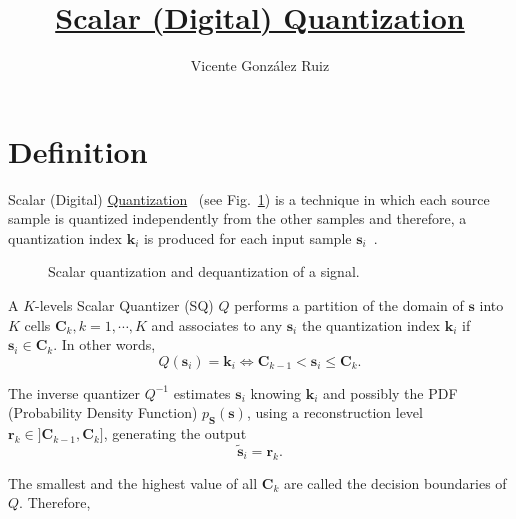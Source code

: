
\title{\href{https://github.com/vicente-gonzalez-ruiz/scalar_quantization}{Scalar (Digital) Quantization}}

\author{Vicente González Ruiz}

\maketitle
\tableofcontents

\section{Definition}

Scalar (Digital)
\href{https://en.wikipedia.org/wiki/Quantization_(signal_processing)}{Quantization}~\cite{sayood2017introduction,vetterli2014foundations}
(see Fig.~\ref{fig:Q}) is a technique in which each source sample is
quantized independently from the other samples and therefore, a
quantization index ${\mathbf k}_i$ is produced for each input sample
${\mathbf s}_i$~\cite{vruiz__signal_quantization}.

\begin{figure}
  \caption{Scalar quantization and dequantization of a signal.}
  \label{fig:Q}
\end{figure}

A $K$-levels Scalar Quantizer (SQ) $Q$ performs a partition of the
domain of ${\mathbf s}$ into $K$ cells ${\mathbf C}_k, k = 1, \cdots,
K$ and associates to any ${\mathbf s}_i$ the quantization index ${\mathbf k}_i$ if
${\mathbf s}_i\in {\mathbf C}_k$. In other words,
\begin{equation}
  Q({\mathbf s}_i) = {\mathbf k}_i \Leftrightarrow {\mathbf C}_{k-1} <
  {\mathbf s}_i \le {\mathbf C}_k.
\end{equation}

The inverse quantizer $Q^{-1}$ estimates ${\mathbf s}_i$ knowing
${\mathbf k}_i$ and possibly the PDF (Probability Density Function)
$p_{\mathbf S}({\mathbf s})$, using a reconstruction level ${\mathbf
  r}_k\in ]{\mathbf C}_{k-1}, {\mathbf C}_k]$, generating the output
\begin{equation}
  \tilde{\mathbf s}_i = {\mathbf r}_k.
\end{equation}

The smallest and the highest value of all ${\mathbf C}_k$ are called
the decision boundaries of $Q$. Therefore,

